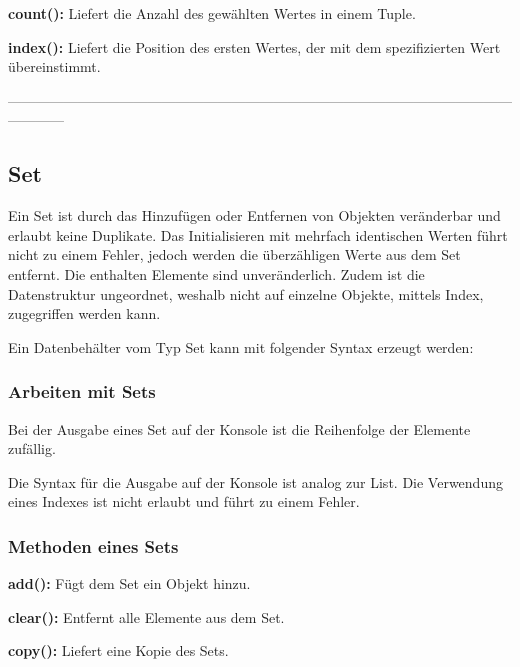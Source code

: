 \textbf{count():}
Liefert die Anzahl des gewählten Wertes in einem Tuple.
    



\textbf{index():}
Liefert die Position des ersten Wertes, der mit dem spezifizierten Wert übereinstimmt.



------------------------------------------------------------------------------------------------------------------------
\subsection{Set}
Ein Set ist durch das Hinzufügen oder Entfernen von Objekten veränderbar und erlaubt keine Duplikate. Das Initialisieren mit mehrfach identischen Werten führt nicht zu einem Fehler, jedoch werden die überzähligen Werte aus dem Set entfernt. Die enthalten Elemente sind unveränderlich. Zudem ist die Datenstruktur ungeordnet, weshalb nicht auf einzelne Objekte, mittels Index, zugegriffen werden kann. 

Ein Datenbehälter vom Typ Set kann mit folgender Syntax erzeugt werden:

    
\subsubsection{Arbeiten mit Sets}
Bei der Ausgabe eines Set auf der Konsole ist die Reihenfolge der Elemente zufällig.

Die Syntax für die Ausgabe auf der Konsole ist analog zur List. Die Verwendung eines Indexes ist nicht erlaubt und führt zu einem Fehler.

 
\subsubsection{Methoden eines Sets}

\textbf{add():}
Fügt dem Set ein Objekt hinzu.
    

\textbf{clear():}
Entfernt alle Elemente aus dem Set.
    

\textbf{copy():}
Liefert eine Kopie des Sets.
    

